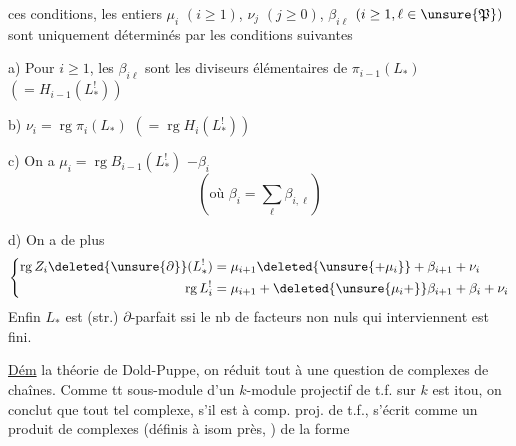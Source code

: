 ces conditions, les entiers $\mu_i$ $(i\geq1)$,
$\nu_j$ $(j\geq0)$, $\beta_{i\ell}$ $(i\geq1,\ell\in\unsure{\mathfrak P})$
sont uniquement
déterminés par les conditions suivantes

a) Pour  $i\geq1$, les $\beta_{i\ell}$ 
sont les  diviseurs
élémentaires de 
$\pi_{i-1}(L_*)$ $(=H_{i-1}(L^!_*))$

b)  $\nu_i=\operatorname{rg}\pi_i(L_*)$
$(=\operatorname{rg}H_i(L^!_*))$

c) On a  $\mu_i=\operatorname{rg}B_{i-1}(L^!_*)$
 $-\beta_i$
\[
(\text{où }\beta_i=\sum_\ell\beta_{i,\ell})
\]

d) On a de plus
\[
\left\{\begin{aligned}
\operatorname{rg}Z_i\deleted{\unsure{\partial}}(L^!_*)
 &=\mu_{i+1}\deleted{\unsure{+\mu_i}}+\beta_{i+1}+\nu_i\\
\operatorname{rg}L^!_i
 &=\mu_{i+1}+\deleted{\unsure{\mu_i+}}\beta_{i+1}+\beta_i+\nu_i
\end{aligned}\right.
\]
Enfin $L_*$ est (str.) $\partial$-parfait ssi le nb de
facteurs non nuls qui interviennent est fini.

\uline{Dém}   la théorie de Dold-Puppe,
on réduit tout à une question de
complexes de chaînes. Comme
tt sous-module d'un $k$-module
projectif de t.f. sur $k$ est itou, on
conclut que tout tel complexe,
s'il est   à comp. proj. de t.f.,
s'écrit comme un produit de
complexes (définis à isom 
 près, 
) de la forme
